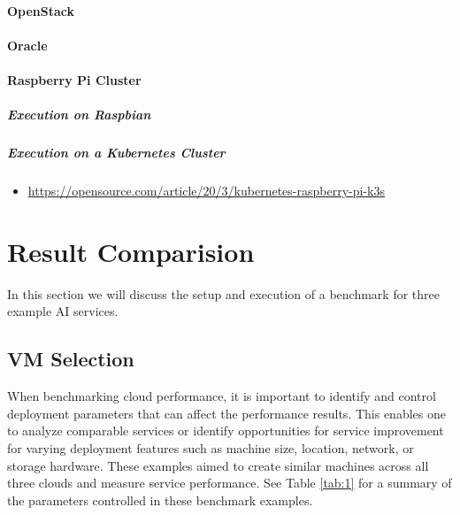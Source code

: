 \hypertarget{openstack}{%
\paragraph{OpenStack}\label{openstack}}

\hypertarget{oracle}{%
\paragraph{Oracle}\label{oracle}}

\hypertarget{raspberry-pi-cluster}{%
\paragraph{Raspberry Pi Cluster}\label{raspberry-pi-cluster}}

\hypertarget{execution-on-raspbian}{%
\subparagraph{Execution on Raspbian}\label{execution-on-raspbian}}

\hypertarget{execution-on-a-kubernetes-cluster}{%
\subparagraph{Execution on a Kubernetes
Cluster}\label{execution-on-a-kubernetes-cluster}}

\begin{itemize}
\tightlist
\item
  \url{https://opensource.com/article/20/3/kubernetes-raspberry-pi-k3s}
\end{itemize}

\section{Result Comparision}\label{result-comparision}

In this section we will discuss the setup and execution of a benchmark
for three example AI services.

\subsection{VM Selection}\label{vm-selection}

When benchmarking cloud performance, it is important to identify and
control deployment parameters that can affect the performance results.
This enables one to analyze comparable services or identify
opportunities for service improvement for varying deployment features
such as machine size, location, network, or storage hardware. These
examples aimed to create similar machines across all three clouds and
measure service performance. See Table \ref{tab:1} for a summary of the parameters
controlled in these benchmark examples.

